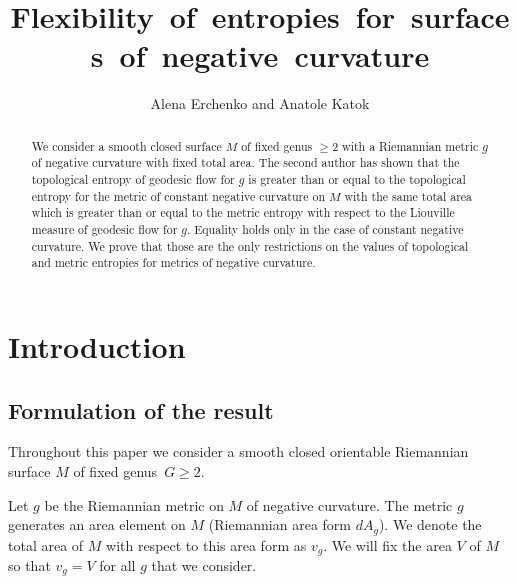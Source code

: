 \documentclass[12pt]{article}
\numberwithin{equation}{section}
\theoremstyle{definition}
\begin{document}
\title{\normalsize \textbf{ Flexibility~of~entropies~for~surfaces~of~negative~curvature}}
\author{ \normalsize Alena Erchenko and Anatole Katok}
\date{}
\maketitle
\thispagestyle{empty} %
\begin{abstract}
We consider a smooth closed surface $M$ of fixed genus $\geqslant 2$ with a Riemannian metric $g$ of negative curvature with fixed total area. The second author has shown that the topological entropy of geodesic flow for $g$ is greater than or equal to the topological entropy for the metric of constant negative curvature on $M$ with the same total area which is greater than or equal to the metric entropy with respect to the Liouville measure of geodesic flow for $g$. Equality holds only in the case of constant negative curvature. We prove that those are the only restrictions on the values of topological and metric entropies for metrics of negative curvature.
\end{abstract}

\tableofcontents

\section{Introduction}

\subsection{Formulation of the result} Throughout this paper we consider a smooth closed orientable Riemannian surface $M$ of fixed genus~$G\geq2$.

Let $g$ be the Riemannian metric on $M$ of negative curvature. The metric $g$ generates an area element on $M$ (Riemannian area form $dA_g$). We denote the total area of $M$ with respect to this area form as $v_g$.  We will fix the area $V$ of $M$ so that $v_g = V$ for all $g$ that we consider. 
\end{document}
